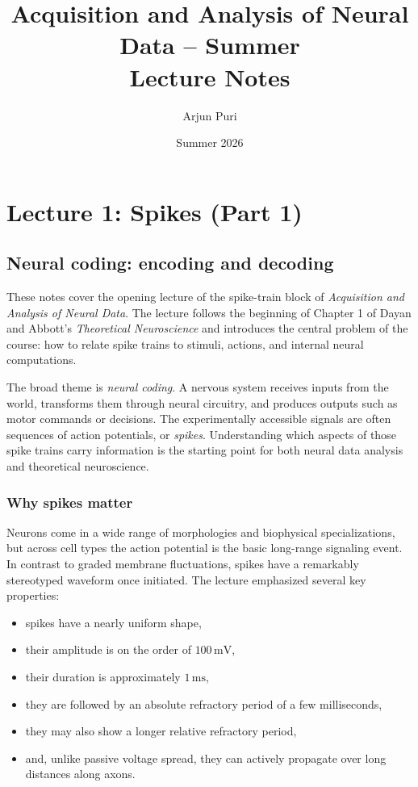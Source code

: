 \documentclass[11pt]{article}
\title{Acquisition and Analysis of Neural Data -- Summer\\Lecture Notes}
\author{Arjun Puri}
\date{Summer 2026}
\begin{document}
\maketitle
\tableofcontents

\section{Lecture 1: Spikes (Part 1)}

\subsection{Neural coding: encoding and decoding}

These notes cover the opening lecture of the spike-train block of \emph{Acquisition and Analysis of Neural Data}. The lecture follows the beginning of Chapter 1 of Dayan and Abbott's \emph{Theoretical Neuroscience} and introduces the central problem of the course: how to relate spike trains to stimuli, actions, and internal neural computations.

The broad theme is \emph{neural coding}. A nervous system receives inputs from the world, transforms them through neural circuitry, and produces outputs such as motor commands or decisions. The experimentally accessible signals are often sequences of action potentials, or \emph{spikes}. Understanding which aspects of those spike trains carry information is the starting point for both neural data analysis and theoretical neuroscience.

\subsubsection{Why spikes matter}

Neurons come in a wide range of morphologies and biophysical specializations, but across cell types the action potential is the basic long-range signaling event. In contrast to graded membrane fluctuations, spikes have a remarkably stereotyped waveform once initiated. The lecture emphasized several key properties:
\begin{itemize}
    \item spikes have a nearly uniform shape,
    \item their amplitude is on the order of $100\,\mathrm{mV}$,
    \item their duration is approximately $1\,\mathrm{ms}$,
    \item they are followed by an absolute refractory period of a few milliseconds,
    \item they may also show a longer relative refractory period,
    \item and, unlike passive voltage spread, they can actively propagate over long distances along axons.
\end{itemize}
\end{document}
